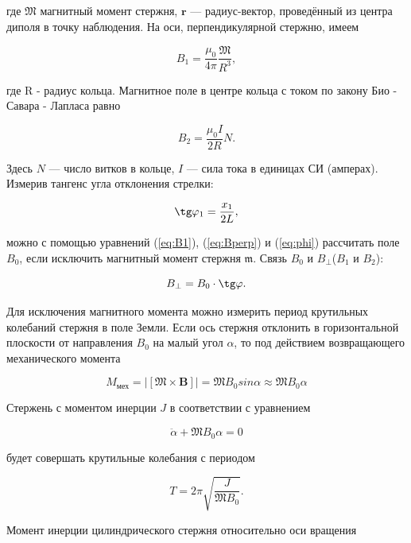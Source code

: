 \documentclass[a4paper,12pt]{article} %
\begin{document}
где $\mathfrak{M}$ магнитный момент стержня, $\textbf{r}$ — радиус-вектор, проведённый из центра диполя в точку наблюдения. На оси, перпендикулярной стержню, имеем

\begin{equation}
	B_1 = \frac{\mu_0}{4\pi}\frac{\mathfrak{M}}{R^3},
	\label{eq:B1}
\end{equation}

где R - радиус кольца.
Магнитное поле в центре кольца с током по закону Био - Савара - Лапласа равно

\begin{equation}
	B_2 = \frac{\mu_0 I}{2R}N.
	\label{eq:B2}
\end{equation}

Здесь $N$ — число витков в кольце, $I$ — сила тока в единицах СИ (амперах).
Измерив тангенс угла отклонения стрелки:

\begin{equation}
	\tg \varphi_1 = \frac{x_1}{2L},
	\label{eq:phi}
\end{equation}

можно с помощью уравнений (\ref{eq:B1}), (\ref{eq:Bperp}) и (\ref{eq:phi}) рассчитать поле $B_0$, если исключить магнитный момент стержня $\mathfrak{m}$.
Связь $B_0$ и $B_\perp$($B_1$ и $B_2$):

\begin{equation}
	B_\perp = B_0 \cdot \tg \varphi.
	\label{eq:Bperp}
\end{equation}

Для исключения магнитного момента можно измерить период крутильных колебаний стержня в поле Земли. Если ось стержня отклонить в горизонтальной плоскости от
направления $B_0$ на малый угол $\alpha$, то под действием возвращающего механического момента

$$ M_\text{мех}=|\left[\mathfrak{M}\times \textbf{B}\right] |=\mathfrak{M} B_0 sin \alpha \approx \mathfrak{M} B_0 \alpha $$

Стержень с моментом инерции $J$ в соответствии с уравнением

$$\ddot{\alpha}+\mathfrak{M} B_0 \alpha = 0$$

будет совершать крутильные колебания с периодом

\begin{equation}
	T = 2\pi \sqrt{\frac{J}{\mathfrak{M} B_0}}.
	\label{eq:t}
\end{equation}

Момент инерции цилиндрического стержня относительно оси вращения
\end{document}
